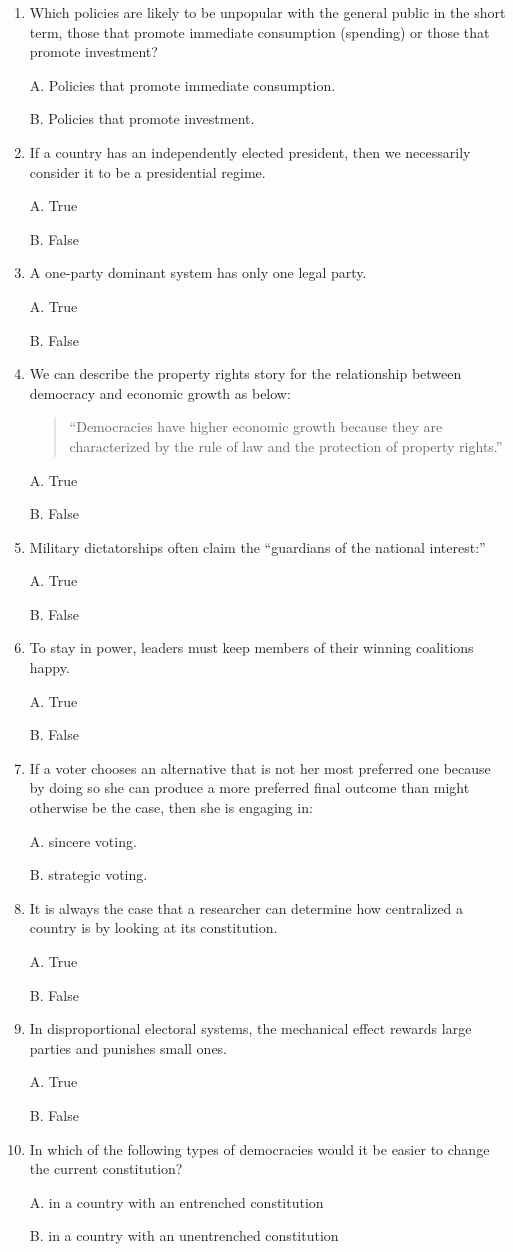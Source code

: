 \documentclass[
]{book}
\begin{document}
\begin{enumerate}
\def\labelenumi{\arabic{enumi}.}
\item
  Which policies are likely to be unpopular with the general public in the short term, those that promote immediate consumption (spending) or those that promote investment?

  A. Policies that promote immediate consumption.

  B. Policies that promote investment.
\item
  If a country has an independently elected president, then we necessarily consider it to be a presidential regime.

  A. True

  B. False
\item
  A one-party dominant system has only one legal party.

  A. True

  B. False
\item
  We can describe the property rights story for the relationship between democracy and economic growth as below:

  \begin{quote}
  ``Democracies have higher economic growth because they are characterized by the rule of law and the protection of property rights.''
  \end{quote}

  A. True

  B. False
\item
  Military dictatorships often claim the ``guardians of the national interest:''

  A. True

  B. False
\item
  To stay in power, leaders must keep members of their winning coalitions happy.

  A. True

  B. False
\item
  If a voter chooses an alternative that is not her most preferred one because by doing so she can produce a more preferred final outcome than might otherwise be the case, then she is engaging in:

  A. sincere voting.

  B. strategic voting.
\item
  It is always the case that a researcher can determine how centralized a country is by looking at its constitution.

  A. True

  B. False
\item
  In disproportional electoral systems, the mechanical effect rewards large parties and punishes small ones.

  A. True

  B. False
\item
  In which of the following types of democracies would it be easier to change the current constitution?

  A. in a country with an entrenched constitution

  B. in a country with an unentrenched constitution
\end{enumerate}
\end{document}
